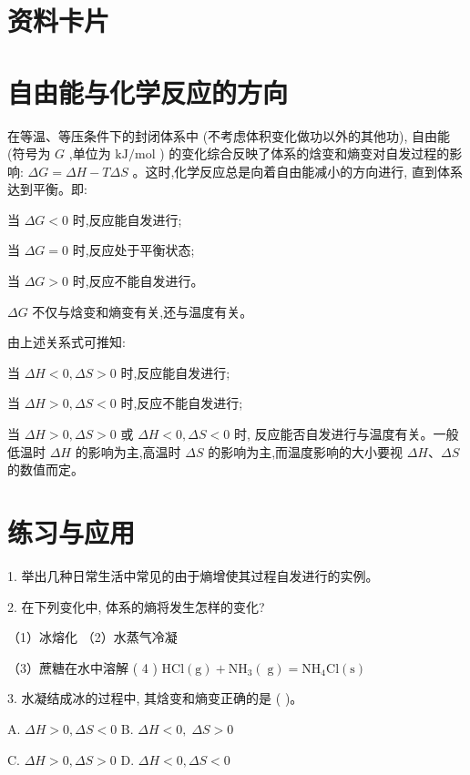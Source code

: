 \documentclass[10pt]{article}
\begin{document}
\section*{资料卡片}

\section*{自由能与化学反应的方向}

在等温、等压条件下的封闭体系中 (不考虑体积变化做功以外的其他功), 自由能 (符号为 \(G\) ,单位为 \(\mathrm{{kJ}}/\mathrm{{mol}}\) ) 的变化综合反映了体系的焓变和熵变对自发过程的影响: \({\Delta G} = {\Delta H} - {T\Delta S}\) 。这时,化学反应总是向着自由能减小的方向进行, 直到体系达到平衡。即:

当 \({\Delta G} < 0\) 时,反应能自发进行;

当 \({\Delta G} = 0\) 时,反应处于平衡状态;

当 \({\Delta G} > 0\) 时,反应不能自发进行。

\({\Delta G}\) 不仅与焓变和熵变有关,还与温度有关。

由上述关系式可推知:

当 \({\Delta H} < 0,{\Delta S} > 0\) 时,反应能自发进行;

当 \({\Delta H} > 0,{\Delta S} < 0\) 时,反应不能自发进行;

当 \({\Delta H} > 0,{\Delta S} > 0\) 或 \({\Delta H} < 0,{\Delta S} < 0\) 时, 反应能否自发进行与温度有关。一般低温时 \({\Delta H}\) 的影响为主,高温时 \({\Delta S}\) 的影响为主,而温度影响的大小要视 \({\Delta H}\text{、}{\Delta S}\) 的数值而定。

\section*{练习与应用}

1. 举出几种日常生活中常见的由于熵增使其过程自发进行的实例。

2. 在下列变化中, 体系的熵将发生怎样的变化?

（1）冰熔化 （2）水蒸气冷凝

（3）蔗糖在水中溶解 ( 4 ) \(\mathrm{{HCl}}\left( \mathrm{g}\right) + {\mathrm{{NH}}}_{3}\left( \mathrm{\;g}\right) = {\mathrm{{NH}}}_{4}\mathrm{{Cl}}\left( \mathrm{s}\right)\)

3. 水凝结成冰的过程中, 其焓变和熵变正确的是 ( )。

A. \({\Delta H} > 0,{\Delta S} < 0\) B. \({\Delta H} < 0,\;{\Delta S} > 0\)

C. \({\Delta H} > 0,{\Delta S} > 0\) D. \({\Delta H} < 0,{\Delta S} < 0\)
\end{document}

